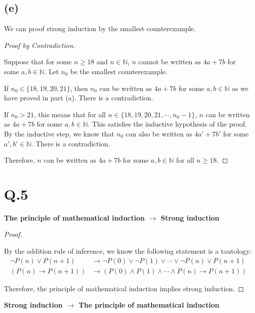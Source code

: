 \documentclass[a4paper,12pt]{article}
\begin{document}
\subsection*{(e)}

We can proof strong induction by the smallest counterexample.

\begin{proof}[Proof by Contradiction]
$ $

Suppose that for some $n \geq 18$ and $n \in \mathbb{N}$, $n$ cannot be written as $4a + 7b$ for some $a, b \in \mathbb{N}$.
Let $n_0$ be the smallest counterexample.

If $n_0 \in \{18, 19, 20, 21\}$, then $n_0$ can be written as $4a + 7b$ for some $a, b \in \mathbb{N}$ as we have proved in part (a).
There is a contradiction.

If $n_0 > 21$, this means that for all $n \in \{18, 19, 20, 21, \cdots, n_0 - 1\}$, $n$ can be written as $4a + 7b$ for some $a, b \in \mathbb{N}$.
This satisfies the inductive hypothesis of the proof.
By the inductive step, we know that $n_0$ can also be written as $4a' + 7b'$ for some $a', b' \in \mathbb{N}$.
There is a contradiction.

Therefore, $n$ can be written as $4a + 7b$ for some $a, b \in \mathbb{N}$ for all $n \geq 18$.
\end{proof}

\section*{Q.5}

\textbf{The principle of mathematical induction $\rightarrow$ Strong induction}

\begin{proof}
$ $

By the addition rule of inference, we know the following statement is a tautology:
\begin{align*}
	\neg P(n) \vee P(n + 1) &\rightarrow \neg P(0) \vee \neg P(1) \vee \cdots \vee \neg P(n) \vee P(n + 1) \\
	(P(n) \rightarrow P(n + 1)) &\rightarrow (P(0) \wedge P(1) \wedge \cdots \wedge P(n) \rightarrow P(n + 1))
\end{align*}

Therefore, the principle of mathematical induction implies strong induction.
\end{proof}

\textbf{Strong induction $\rightarrow$ The principle of mathematical induction}
\end{document}
